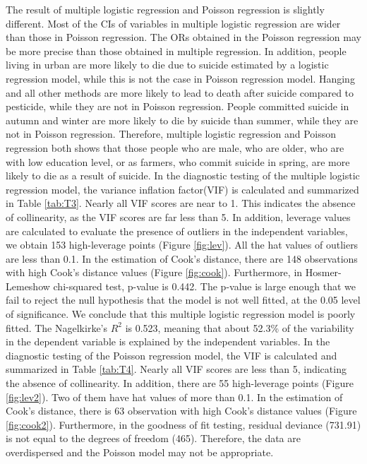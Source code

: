 \documentclass[a4paper]{article}
\begin{document}
\newline
\newline
The result of multiple logistic regression and Poisson regression is slightly different. Most of the CIs of variables in multiple logistic regression are wider than those in Poisson regression. The ORs obtained in the Poisson regression may be more precise than those obtained in multiple regression. In addition, people living in urban are more likely to die due to suicide estimated by a logistic regression model, while this is not the case in Poisson regression model. Hanging and all other methods are more likely to lead to death after suicide compared to pesticide, while they are not in Poisson regression. People committed suicide in autumn and winter are more likely to die by suicide than summer, while they are not in Poisson regression. Therefore, multiple logistic regression and Poisson regression both shows that those people who are male, who are older, who are with low education level, or as farmers, who commit suicide in spring, are more likely to die as a result of suicide. 
\newline
\newline
In the diagnostic testing of the multiple logistic regression model, the variance inflation factor(VIF) is calculated and summarized in Table \ref{tab:T3}. Nearly all VIF scores are near to 1. This indicates the absence of collinearity, as the VIF scores are far less than 5. In addition, leverage values are calculated to evaluate the presence of outliers in the independent variables, we obtain 153 high-leverage points (Figure \ref{fig:lev}). All the hat values of outliers are less than 0.1. In the estimation of Cook's distance, there are 148 observations with high Cook's distance values (Figure \ref{fig:cook}). Furthermore, in Hosmer-Lemeshow chi-squared test, p-value is 0.442. The p-value is large enough that we fail to reject the null hypothesis that the model is not well fitted, at the 0.05 level of significance. We conclude that this multiple logistic regression model is poorly fitted. The Nagelkirke's $R^2$ is 0.523, meaning that about 52.3\% of the variability in the dependent variable is explained by the independent variables.
\newline
\newline
In the diagnostic testing of the Poisson regression model, the VIF is calculated and summarized in Table \ref{tab:T4}. Nearly all VIF scores are less than 5, indicating the absence of collinearity. In addition, there are 55 high-leverage points (Figure \ref{fig:lev2}). Two of them have hat values of more than 0.1. In the estimation of Cook's distance, there is 63 observation with high Cook's distance values (Figure \ref{fig:cook2}). Furthermore, in the goodness of fit testing, residual deviance (731.91) is not equal to the degrees of freedom (465). Therefore, the data are overdispersed and the Poisson model may not be appropriate.
\end{document}
